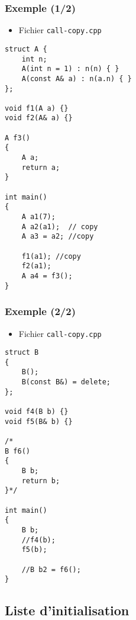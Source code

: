 \begin{frame}[containsverbatim]
\frametitle{Exemple (1/2)}
\begin{itemize}
\item Fichier \texttt{call-copy.cpp}
\end{itemize}
\begin{lstlisting}
struct A {
    int n;
    A(int n = 1) : n(n) { }
    A(const A& a) : n(a.n) { } 
};
 
void f1(A a) {}
void f2(A& a) {}

A f3()
{
    A a; 
    return a;
}

int main()
{
    A a1(7);
    A a2(a1);  // copy
    A a3 = a2; //copy
    
    f1(a1); //copy
    f2(a1);
    A a4 = f3();
}
\end{lstlisting}
\end{frame}

\begin{frame}[containsverbatim]
\frametitle{Exemple (2/2)}
\begin{itemize}
\item Fichier \texttt{call-copy.cpp}
\end{itemize}
\begin{lstlisting}
struct B
{
    B();
    B(const B&) = delete;
};

void f4(B b) {}
void f5(B& b) {}

/*
B f6()
{
    B b;
    return b;
}*/

int main()
{
    B b;    
    //f4(b);
    f5(b);
    
    //B b2 = f6();
}
\end{lstlisting}
\end{frame}

\subsection{Liste d'initialisation}

